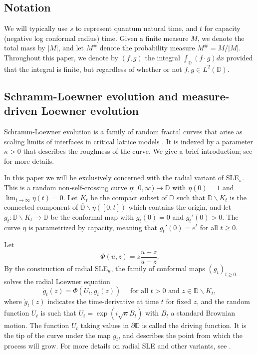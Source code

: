 \documentclass[a4paper]{article}
\numberwithin{equation}{section}
\newcommand{\D}{\mathbb{D}}
\newcommand{\clD}{\overline{\mathbb{D}}}
\theoremstyle{remark}
\numberwithin{equation}{section}
\begin{document}
\subsection{Notation}
We will typically use $s$ to represent quantum natural time, and $t$ for capacity (negative log conformal radius) time. Given a finite measure $M$, we denote the total mass by $|M|$, and let $M^{\#}$ denote the probability measure $M^\# = M/|M|$. Throughout this paper, we denote by $(f, g)$ the integral $\int_{\D}(f \cdot g) dx$ provided that the integral is finite, but regardless of whether or not $f, g \in L^2(\D)$.

\subsection{Schramm-Loewner evolution and measure-driven Loewner evolution}\label{subsec-sle}
Schramm-Loewner evolution is a family of random fractal curves that arise as scaling limits of interfaces in critical lattice models \cite{schramm0, smirnov-cardy, lsw-lerw-ust, smirnov-ising}. It is indexed by a parameter $\kappa >0$ that describes the roughness of the curve. We give a brief introduction; see \cite{lawler2008conformally} for more details.  

In this paper we will be exclusively concerned with the radial variant of SLE$_\kappa$. This is a random non-self-crossing curve $\eta:[0,\infty) \to \clD$ with $\eta(0) = 1$ and $\lim_{t\to\infty} \eta(t) = 0$. Let $K_t$ be the compact subset of $\clD$ such that $\clD \backslash K_t$ is the connected component of $\clD \backslash \eta([0,t])$ which contains the origin, and let $g_t: \D \backslash K_t \to \D$ be the conformal map with $g_t(0) =0$ and $g_t'(0) > 0$. The curve $\eta$ is parametrized by capacity, meaning that $g_t'(0) = e^{t}$ for all $t \geq 0$. 

Let
\[\Phi(u, z) = z\frac{u + z}{u - z}.\]
By the construction of radial SLE$_\kappa$, the family of conformal maps $(g_t)_{t \geq0}$ solves the  radial Loewner equation
\[
    \dot g_t(z) = \Phi(U_t, g_t(z)) \quad \text{ for all }t > 0 \text{ and }z \in \D \backslash K_t,
    \]
where $\dot g_t(z)$ indicates the time-derivative at time $t$ for fixed $z$, and the random function $U_t$ is such that $U_t = \exp(i\sqrt{\kappa}B_t)$ with $B_t$ a standard Brownian motion. 
The function $U_t$ taking values in $\partial \D$ is called the {driving function}. It is the tip of the curve under the map $g_t$, and describes the point from which the process will grow. 
For more details on radial SLE and other variants, see \cite{lawler2008conformally}.
\end{document}

